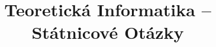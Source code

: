 \documentclass{article}
\theoremstyle{plain}
\theoremstyle{definition}
\begin{document}
\title{Teoretická Informatika -- Státnicové Otázky}

\maketitle
\tableofcontents
\thispagestyle{empty} %
\clearpage %
\setcounter{page}{1} %










\end{document}
